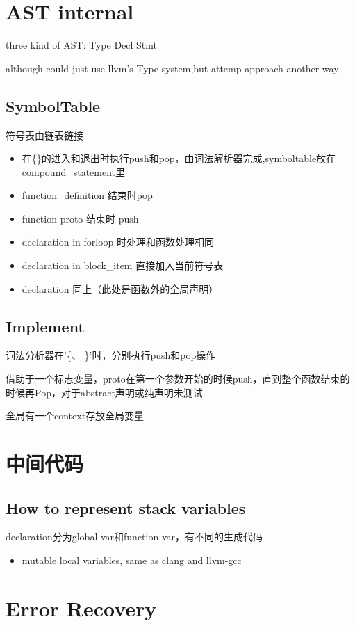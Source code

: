 \documentclass[11pt]{article} %
\begin{document}
\section{AST internal}
three kind of AST: Type Decl Stmt

although could just use llvm's Type system,but attemp approach another way
\subsection{SymbolTable}
符号表由链表链接
\begin{itemize}
\item 在\{\}的进入和退出时执行push和pop，由词法解析器完成,symboltable放在compound\_statement里
\item function\_definition 结束时pop
\item function proto 结束时 push
\item declaration in for\-loop 时处理和函数处理相同
\item declaration in block\_item 直接加入当前符号表
\item declaration 同上（此处是函数外的全局声明）
\end{itemize}

\subsection{Implement}
词法分析器在'\{、 \}'时，分别执行push和pop操作

借助于一个标志变量，proto在第一个参数开始的时候push，直到整个函数结束的时候再Pop，对于abstract声明或纯声明未测试

全局有一个context存放全局变量


\section{中间代码}

\subsection{How to represent stack variables}
declaration分为global var和function var，有不同的生成代码

\begin{itemize}
\item mutable local variables, same as clang and llvm-gcc
\end{itemize}

\section{Error Recovery}
\end{document}
